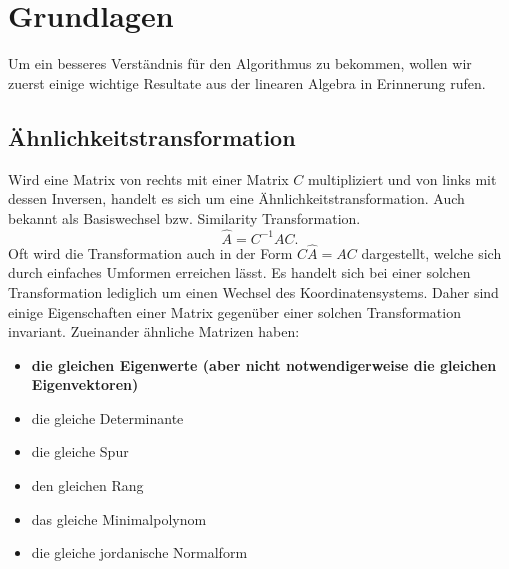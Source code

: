 %
%
%
\section{Grundlagen\label{francis:section:grundlagen}}
Um ein besseres Verständnis für den Algorithmus zu bekommen, wollen wir zuerst einige wichtige Resultate aus der linearen Algebra in Erinnerung rufen.

\subsection{Ähnlichkeitstransformation\label{francis:section:grundlagen:aehnlichkeitstransform}}
Wird eine Matrix von rechts mit einer Matrix $C$ multipliziert und von links mit dessen Inversen, handelt es sich um eine Ähnlichkeitstransformation. 
Auch bekannt als Basiswechsel bzw. Similarity Transformation.
\begin{equation}
	\hat{A}=C^{-1}AC.
\end{equation}
Oft wird die Transformation auch in der Form $C\hat{A}=AC$ dargestellt, welche sich durch einfaches Umformen erreichen lässt.
Es handelt sich bei einer solchen Transformation lediglich um einen Wechsel des Koordinatensystems.
Daher sind einige Eigenschaften einer Matrix gegenüber einer solchen Transformation invariant.
Zueinander ähnliche Matrizen haben:
\begin{itemize}
	\item \textbf{die gleichen Eigenwerte (aber nicht notwendigerweise die gleichen Eigenvektoren)}
	\item die gleiche Determinante
	\item die gleiche Spur
	\item den gleichen Rang
	\item das gleiche Minimalpolynom
	\item die gleiche jordanische Normalform
\end{itemize}

